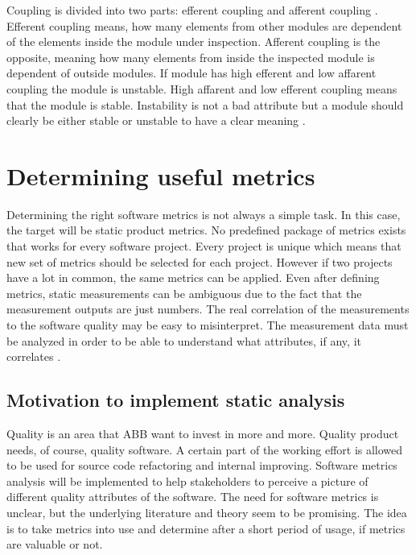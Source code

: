 Coupling is divided into two parts: efferent coupling and afferent coupling \cite{gupta2009package}. Efferent coupling means, how many elements from other modules are dependent of the elements inside the module under inspection. Afferent coupling is the opposite, meaning how many elements from inside the inspected module is dependent of outside modules. If module has high efferent and low affarent coupling the module is unstable. High affarent and low efferent coupling means that the module is stable. Instability is not a bad attribute but a module should clearly be either stable or unstable to have a clear meaning \cite{gupta2009package}.







\chapter{Determining useful metrics}

Determining the right software metrics is not always a simple task. In this case, the target will be static product metrics. No predefined package of metrics exists that works for every software project. Every project is unique which means that new set of metrics should be selected for each project. However if two projects have a lot in common, the same metrics can be applied. Even after defining metrics, static measurements can be ambiguous due to the fact that the measurement outputs are just numbers. The real correlation of the measurements to the software quality may be easy to misinterpret. The measurement data must be analyzed in order to be able to understand what attributes, if any, it correlates \cite{sommerville2011software}. 

\section{Motivation to implement static analysis}

Quality is an area that ABB want to invest in more and more. Quality product needs, of course, quality software. A certain part of the working effort is allowed to be used for source code refactoring and internal improving. Software metrics analysis will be implemented to help stakeholders to perceive a picture of different quality attributes of the software. The need for software metrics is unclear, but the underlying literature and theory seem to be promising. The idea is to take metrics into use and determine after a short period of usage, if metrics are valuable or not.

